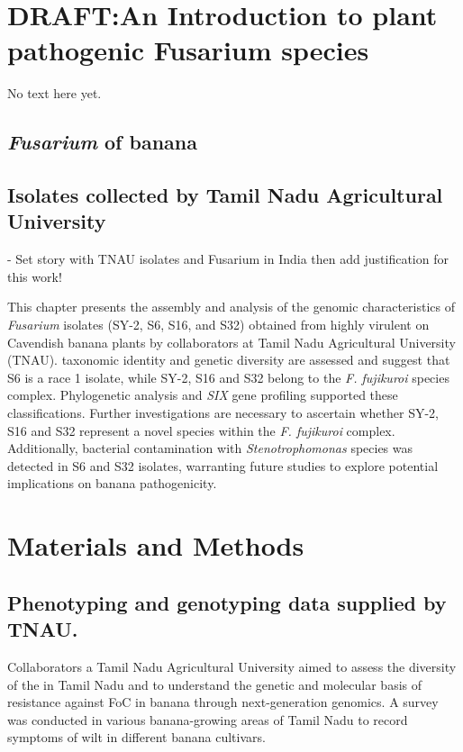 
\section{\textbf{DRAFT:}An Introduction to plant pathogenic Fusarium species}
No text here yet. 



\subsection{\textit{Fusarium} of banana}
\subsection{Isolates collected by Tamil Nadu Agricultural University}

- Set story with TNAU isolates and Fusarium in India then add justification for this work!

This chapter presents the assembly and analysis of the genomic characteristics of \textit{Fusarium} isolates (SY-2, S6, S16, and S32) obtained from highly virulent on Cavendish banana plants by collaborators at Tamil Nadu Agricultural University (TNAU). taxonomic identity and genetic diversity are assessed and suggest that S6 is a \Focub race 1 isolate, while SY-2, S16 and S32 belong to the\textit{ F. fujikuroi} species complex. Phylogenetic analysis and \textit{SIX} gene profiling supported these classifications. Further investigations are necessary to ascertain whether SY-2, S16 and S32 represent a novel species within the \textit{F. fujikuroi} complex. Additionally, bacterial contamination with \textit{Stenotrophomonas} species was detected in S6 and S32 isolates, warranting future studies to explore potential implications on banana pathogenicity.


\section{Materials and Methods}
\subsection{Phenotyping and genotyping data supplied by TNAU.}

Collaborators a Tamil Nadu Agricultural University aimed to assess the diversity of the \Foc in Tamil Nadu and to understand the genetic and molecular basis of resistance against FoC in banana through next-generation genomics. A survey was conducted in various banana-growing areas of Tamil Nadu to record symptoms of wilt in different banana cultivars. 

